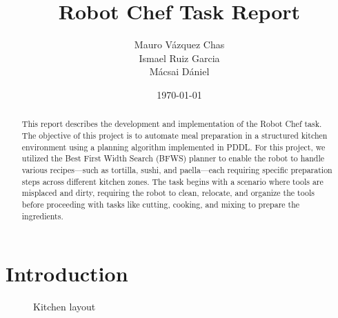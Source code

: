 \documentclass[a4paper,12pt]{article}
\title{\textbf{Robot Chef Task Report}\vspace{1in}}
\author{Mauro Vázquez Chas \\[1em]
Ismael Ruiz Garcia \\[1em]
Mácsai Dániel\vspace{1in}
}
\date{\today \vspace{1.5in}}
\begin{document}
\maketitle

\begin{abstract}
    This report describes the development and implementation of the Robot Chef task. The objective of this project is to automate meal preparation in a structured kitchen environment using a planning algorithm implemented in PDDL. For this project, we utilized the Best First Width Search (BFWS) planner to enable the robot to handle various recipes—such as tortilla, sushi, and paella—each requiring specific preparation steps across different kitchen zones. The task begins with a scenario where tools are misplaced and dirty, requiring the robot to clean, relocate, and organize the tools before proceeding with tasks like cutting, cooking, and mixing to prepare the ingredients.
\end{abstract}

\newpage
\tableofcontents
\newpage

\section{Introduction}
\label{sec:introduction}
\begin{wrapfigure}{r}{0.5\textwidth}
    \centering
    \caption{Kitchen layout}
    \label{fig:kitchen_layout}
\end{wrapfigure}
\end{document}
